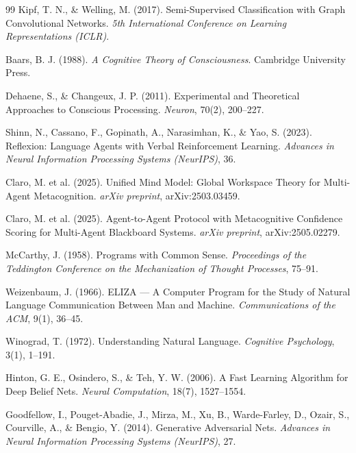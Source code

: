\begin{thebibliography}{99}
Kipf, T. N., \& Welling, M. (2017). Semi-Supervised Classification with Graph Convolutional Networks.
\textit{5th International Conference on Learning Representations (ICLR)}.

Baars, B. J. (1988). \textit{A Cognitive Theory of Consciousness}. Cambridge University Press.

Dehaene, S., \& Changeux, J. P. (2011). Experimental and Theoretical Approaches to Conscious Processing.
\textit{Neuron}, 70(2), 200--227.

Shinn, N., Cassano, F., Gopinath, A., Narasimhan, K., \& Yao, S. (2023). Reflexion: Language Agents with Verbal Reinforcement Learning.
\textit{Advances in Neural Information Processing Systems (NeurIPS)}, 36.

Claro, M. et al. (2025). Unified Mind Model: Global Workspace Theory for Multi-Agent Metacognition.
\textit{arXiv preprint}, arXiv:2503.03459.

Claro, M. et al. (2025). Agent-to-Agent Protocol with Metacognitive Confidence Scoring for Multi-Agent Blackboard Systems.
\textit{arXiv preprint}, arXiv:2505.02279.

McCarthy, J. (1958). Programs with Common Sense.
\textit{Proceedings of the Teddington Conference on the Mechanization of Thought Processes}, 75--91.

Weizenbaum, J. (1966). ELIZA — A Computer Program for the Study of Natural Language Communication Between Man and Machine.
\textit{Communications of the ACM}, 9(1), 36--45.

Winograd, T. (1972). Understanding Natural Language.
\textit{Cognitive Psychology}, 3(1), 1--191.

Hinton, G. E., Osindero, S., \& Teh, Y. W. (2006). A Fast Learning Algorithm for Deep Belief Nets.
\textit{Neural Computation}, 18(7), 1527--1554.

Goodfellow, I., Pouget-Abadie, J., Mirza, M., Xu, B., Warde-Farley, D., Ozair, S., Courville, A., \& Bengio, Y. (2014). Generative Adversarial Nets.
\textit{Advances in Neural Information Processing Systems (NeurIPS)}, 27.

\end{thebibliography}
